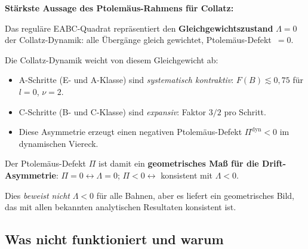 \documentclass[12pt,a4paper]{article}
\newcommand{\Ptol}{\Pi}             %
\begin{document}
\begin{tcolorbox}[hauptsatz]
\textbf{Stärkste Aussage des Ptolemäus-Rahmens für Collatz:}

\medskip
Das reguläre EABC-Quadrat repräsentiert den \textbf{Gleichgewichtszustand}
$\Lambda = 0$ der Collatz-Dynamik: alle Übergänge gleich gewichtet,
Ptolemäus-Defekt~$= 0$.

\medskip
Die Collatz-Dynamik weicht von diesem Gleichgewicht ab:
\begin{itemize}[leftmargin=*]
  \item A-Schritte (E- und A-Klasse) sind \emph{systematisch kontraktiv}:
    $F(B) \lesssim 0{,}75$ für $l=0$, $\nu=2$.
  \item C-Schritte (B- und C-Klasse) sind \emph{expansiv}:
    Faktor $3/2$ pro Schritt.
  \item Diese Asymmetrie erzeugt einen negativen Ptolemäus-Defekt
    $\Ptol^{\mathrm{dyn}} < 0$ im dynamischen Viereck.
\end{itemize}

\medskip
Der Ptolemäus-Defekt $\Ptol$ ist damit ein \textbf{geometrisches Maß für die
Drift-Asymmetrie}: $\Ptol = 0 \leftrightarrow \Lambda = 0$;
$\Ptol < 0 \leftrightarrow$ konsistent mit $\Lambda < 0$.

\medskip
Dies \emph{beweist nicht} $\Lambda < 0$ für alle Bahnen, aber es liefert
ein geometrisches Bild, das mit allen bekannten analytischen Resultaten
konsistent ist.
\end{tcolorbox}

\subsection{Was nicht funktioniert und warum}
\end{document}
